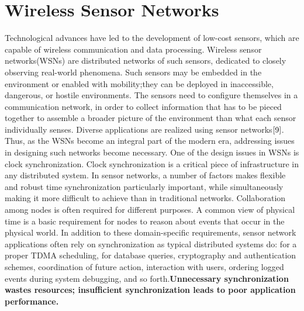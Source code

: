 \documentclass[a4paper,8pt]{report}
\begin{document}
\section{Wireless Sensor Networks} Technological advances have led
to the development of low-cost sensors, which are capable of
wireless communication and data processing. Wireless sensor
networks(WSNs) are distributed networks of such sensors, dedicated
to closely observing real-world phenomena. Such sensors may be
embedded in the environment  or enabled with mobility;they can be
deployed in inaccessible, dangerous, or hostile environments. The
sensors need to configure themselves in a communication network, in
order to collect information that has to be pieced together to
assemble a broader picture of the environment than what each sensor
individually senses. Diverse applications are realized using sensor
networks$\cite{9}$. Thus, as the WSNs become an integral part of the
modern era, addressing issues in designing such networks become
necessary.
\newline One of the design issues in WSNs is clock
synchronization. Clock synchronization is a critical piece of
infrastructure in any distributed system. In sensor networks, a
number of factors makes flexible and robust time synchronization
particularly important, while simultaneously making it more
difficult to achieve than in traditional networks.
\newline
Collaboration among nodes is often required for different purposes.
A common view of physical time is a basic requirement for nodes to
reason about events that occur in the physical world. In addition to
these domain-specific requirements, sensor network applications
often rely on synchronization as typical distributed systems do: for
a proper TDMA scheduling, for database queries, cryptography and
authentication schemes, coordination of future action, interaction
with users, ordering logged events during system debugging, and so
forth.\newline \textbf{Unnecessary synchronization wastes resources;
insufficient synchronization leads to poor application performance.
}\newpage
\end{document}
